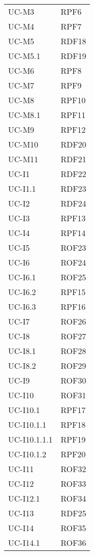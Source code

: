 \begin{longtable}{| p{5cm} | p{5cm} |}
		UC-M3 & RPF6 \\
		\rowcolor{LightGray}
		UC-M4 & RPF7\\
		UC-M5 & RDF18 \\
		\rowcolor{LightGray}
		UC-M5.1 & RDF19 \\
		UC-M6 & RPF8 \\
		\rowcolor{LightGray}
		UC-M7 & RPF9 \\
		UC-M8 & RPF10\\
		\rowcolor{LightGray}
		UC-M8.1 & RPF11\\
		UC-M9 & RPF12\\
		\rowcolor{LightGray}
		UC-M10 & RDF20\\
		UC-M11 & RDF21\\
		\rowcolor{LightGray}
		UC-I1 & RDF22 \\
		UC-I1.1 & RDF23 \\
		\rowcolor{LightGray}
		UC-I2 & RDF24 \\
		UC-I3 & RPF13 \\
		\rowcolor{LightGray}
		UC-I4 & RPF14 \\
		UC-I5 & ROF23\\
		\rowcolor{LightGray}
		UC-I6 & ROF24 \\
		UC-I6.1 & ROF25 \\
		\rowcolor{LightGray}
		UC-I6.2 & RPF15 \\
		UC-I6.3 & RPF16 \\
		\rowcolor{LightGray}
		UC-I7 & ROF26\\
		UC-I8 & ROF27 \\
		\rowcolor{LightGray}
		UC-I8.1 & ROF28 \\
		UC-I8.2 & ROF29 \\
		\rowcolor{LightGray}
		UC-I9 & ROF30 \\
		UC-I10 & ROF31 \\
		\rowcolor{LightGray}
		UC-I10.1 & RPF17 \\
		UC-I10.1.1 & RPF18\\
		\rowcolor{LightGray}
		UC-I10.1.1.1 & RPF19 \\
		UC-I10.1.2 & RPF20 \\
		\rowcolor{LightGray}
		UC-I11 & ROF32 \\
		UC-I12 & ROF33 \\
		\rowcolor{LightGray}
		UC-I12.1 & ROF34 \\
		UC-I13 & RDF25 \\
		\rowcolor{LightGray}
		UC-I14 & ROF35 \\
		UC-I14.1 & ROF36 \\

\end{longtable}
